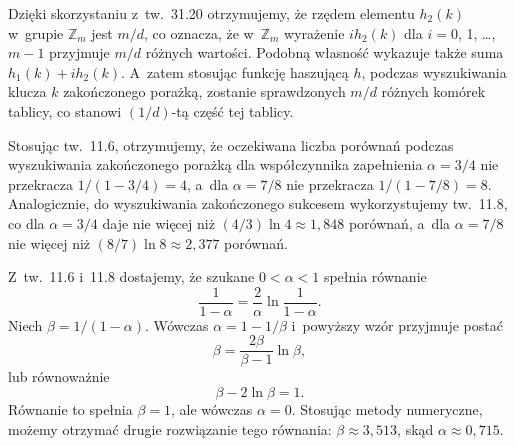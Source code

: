 \exercise %
Dzięki skorzystaniu z~tw.\ 31.20 otrzymujemy, że rzędem elementu $h_2(k)$ w~grupie $\mathbb{Z}_m$ jest $m/d$, co oznacza, że w~$\mathbb{Z}_m$ wyrażenie $ih_2(k)$ dla $i=0$, 1, \dots, $m-1$ przyjmuje $m/d$ różnych wartości.
Podobną własność wykazuje także suma $h_1(k)+ih_2(k)$.
A~zatem stosując funkcję haszującą $h$, podczas wyszukiwania klucza $k$ zakończonego porażką, zostanie sprawdzonych $m/d$ różnych komórek tablicy, co stanowi $(1/d)$-tą część tej tablicy.

\exercise %

\noindent Stosując tw.\ 11.6, otrzymujemy, że oczekiwana liczba porównań podczas wyszukiwania zakończonego porażką dla współczynnika zapełnienia $\alpha=3/4$ nie przekracza $1/(1-3/4)=4$, a~dla $\alpha=7/8$ nie przekracza $1/(1-7/8)=8$.
Analogicznie, do wyszukiwania zakończonego sukcesem wykorzystujemy tw.\ 11.8, co dla $\alpha=3/4$ daje nie więcej niż $(4/3)\ln4\approx1{,}848$ porównań, a~dla $\alpha=7/8$ nie więcej niż $(8/7)\ln8\approx2{,}377$ porównań.

\exercise %
Z~tw.\ 11.6 i~11.8 dostajemy, że szukane $0<\alpha<1$ spełnia równanie
\[
	\frac{1}{1-\alpha} = \frac{2}{\alpha}\ln\frac{1}{1-\alpha}.
\]
Niech $\beta=1/(1-\alpha)$.
Wówczas $\alpha=1-1/\beta$ i~powyższy wzór przyjmuje postać
\[
	\beta = \frac{2\beta}{\beta-1}\ln\beta,
\]
lub równoważnie
\[
	\beta-2\ln\beta = 1.
\]
Równanie to spełnia $\beta=1$, ale wówczas $\alpha=0$.
Stosując metody numeryczne, możemy otrzymać drugie rozwiązanie tego równania: $\beta\approx3{,}513$, skąd $\alpha\approx0{,}715$.
